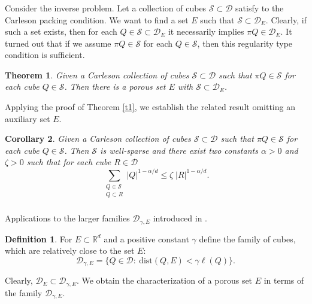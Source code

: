 \documentclass[12pt]{amsart} \setlength{\textwidth}{15cm} \setlength{\textheight}{24cm} \setlength{\voffset}{-1cm} \setlength{\oddsidemargin}{-0.4cm} \setlength{\evensidemargin}{-0.4cm}
\newtheorem {theorem} {Theorem}
\newtheorem {corollary} [theorem]{Corollary}
\theoremstyle{definition}
\newtheorem{df}{Definition}
\theoremstyle{remark}
\newcommand{\rd}{\mathbb{R}^d}
\begin{document}
\subsubsection{}
Consider the inverse problem.
  Let a collection of cubes $\mathcal{S}\subset \mathcal{D}$ satisfy to the   Carleson packing condition. We want to find a set $E$ such that $ \mathcal{S} \subset \mathcal{D}_E$. Clearly, if such a set exists,  then for each $Q \in \mathcal{S} \subset \mathcal{D}_E$ it    necessarily implies
$\pi Q \in \mathcal{D}_E$.   It turned out  that if we assume  $\pi Q \in \mathcal{S}$ for each $Q \in \mathcal{S}$, then this  regularity type condition  is sufficient.
\begin{theorem} \label{t2}
 Given  a Carleson collection of cubes $\mathcal{S}\subset \mathcal{D}$ such that  $\pi Q \in \mathcal{S}$ for each cube $Q\in \mathcal{S}$. Then there is a porous set $E$ with
    $ \mathcal{S} \subset \mathcal{D}_E$.
\end{theorem}
   Applying the proof of Theorem \ref{t1}, we establish the related  result omitting an auxiliary    set $E$.

    \begin{corollary}\label{cor5}
       Given a Carleson collection of cubes $\mathcal{S}\subset \mathcal{D}$ such that    $\pi Q \in \mathcal{S}$ for each   cube $Q\in \mathcal{S}$. Then $\mathcal{S}$  is well-sparse and there exist two constants $ \alpha >0$ and $\zeta >0$ such that  for each cube $R \in \mathcal{D}$
      \[ \sum_{\substack {Q \in \mathcal{S}\\ Q\subset R}}|Q|^{1-\alpha /d}\leq \zeta \;|R|^{1-\alpha /d}.\]
        \end{corollary}
        \subsubsection{}
Applications to the larger families  $\mathcal{D}_{\gamma, E}$ introduced in  \cite{IV}.
  \begin{df}
     For  $E \subset \rd$   and a positive constant $\gamma$ define  the family of cubes, which are relatively close  to the set $E$:
     \begin{equation}\label{eee}
       \mathcal{D}_{\gamma, E}=\{Q \in \mathcal{D}: \: \mathrm{dist}(Q, E) < \gamma \ell(Q)\}.
     \end{equation}
  \end{df}
    Clearly,
 $ \mathcal{D}_E  \subset \mathcal{D}_{\gamma, E}$.
 We obtain  the characterization of a porous set $E$ in terms of the family  $\mathcal{D}_{\gamma, E} $.
\end{document}

